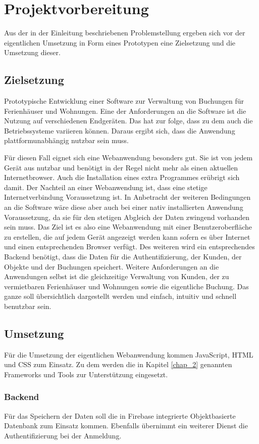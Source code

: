 \chapter{Projektvorbereitung}
Aus der in der Einleitung beschriebenen Problemstellung ergeben sich vor der eigentlichen Umsetzung in Form eines Prototypen eine Zielsetzung und die Umsetzung dieser.

\section{Zielsetzung}
Prototypische Entwicklung einer Software zur Verwaltung von Buchungen für Ferienhäuser und Wohnungen. Eine der Anforderungen an die Software ist die Nutzung auf verschiedenen Endgeräten. Das hat zur folge, dass zu dem auch die Betriebssysteme variieren können. Daraus ergibt sich, dass die Anwendung plattformunabhängig nutzbar sein muss. 

Für diesen Fall eignet sich eine Webanwendung besonders gut. Sie ist von jedem Gerät aus nutzbar und benötigt in der Regel nicht mehr als einen aktuellen Internetbrowser. Auch die Installation eines extra Programmes erübrigt sich damit. Der Nachteil an einer Webanwendung ist,  dass eine stetige Internetverbindung Voraussetzung ist. In Anbetracht der weiteren Bedingungen an die Software wäre diese aber auch bei einer nativ installierten Anwendung Voraussetzung, da sie für den stetigen Abgleich der Daten zwingend vorhanden sein muss. 
Das Ziel ist es also eine Webanwendung mit einer Benutzeroberfläche zu erstellen, die auf jedem Gerät angezeigt werden kann sofern es über Internet und einen entsprechenden Browser verfügt. Des weiteren wird ein entsprechendes Backend benötigt, dass die Daten für die Authentifizierung, der Kunden, der Objekte und der Buchungen speichert.
Weitere Anforderungen an die Anwendungen selbst ist die gleichzeitige Verwaltung von Kunden, der zu vermietbaren Ferienhäuser und Wohnungen sowie die eigentliche Buchung. Das ganze soll übersichtlich dargestellt werden und einfach, intuitiv und schnell benutzbar sein.
\newpage
\section{Umsetzung}

Für die Umsetzung der eigentlichen Webanwendung kommen JavaScript, HTML und CSS zum Einsatz. Zu dem werden die in Kapitel \ref{chap_2} genannten Frameworks und Tools zur Unterstützung eingesetzt. 

\subsection{Backend}
Für das Speichern der Daten soll die in Firebase integrierte Objektbasierte Datenbank zum Einsatz kommen. Ebenfalls übernimmt ein weiterer Dienst die Authentifizierung bei der Anmeldung.

